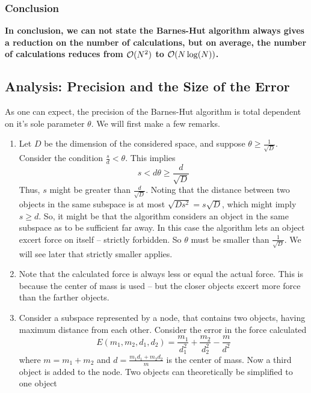 \subsubsection*{Conclusion}
\textbf{In conclusion, we can not state the Barnes-Hut algorithm always gives a reduction on the number of calculations, but on average, the number of calculations reduces from $\mathcal{O}(N^2)$ to $\mathcal{O}(N\log(N))$.}
\subsection{Analysis: Precision and the Size of the Error}
As one can expect, the precision of the Barnes-Hut algorithm is total dependent on it's sole parameter $\theta$. We will first make a few remarks.
\begin{enumerate}
\item Let $D$ be the dimension of the considered space, and suppose $\theta \geq \frac{1}{\sqrt{D}}$. Consider the condition $\frac{s}{d} < \theta$. This implies
\[
s < d\theta \geq \frac{d}{\sqrt{D}}
\]
Thus, $s$ might be greater than $\frac{d}{\sqrt{D}}$. Noting that the distance between two objects in the same subspace is at most $\sqrt{Ds^2} = s\sqrt{D}$, which might imply $s\geq d$. So, it might be that the algorithm considers an object in the same subspace as to be sufficient far away. In this case the algorithm lets an object excert force on itself -- strictly forbidden. So $\theta$ must be smaller than $\frac{1}{\sqrt{D}}$. We will see later that strictly smaller applies.
\item Note that the calculated force is always less or equal the actual force. This is because the center of mass is used -- but the closer objects excert more force than the farther objects.
\item Consider a subspace represented by a node, that contains two objects, having maximum distance from each other. Consider the error in the force calculated
\[
E(m_1,m_2,d_1,d_2) = \frac{m_1}{d_1^2}+\frac{m_2}{d_2^2}-\frac{m}{d^2}
\]
where $m = m_1+m_2$ and $d = \frac{m_1d_1+m_2d_2}{m}$ is the center of mass. Now a third object is added to the node. Two objects can theoretically be simplified to one object
\end{enumerate}